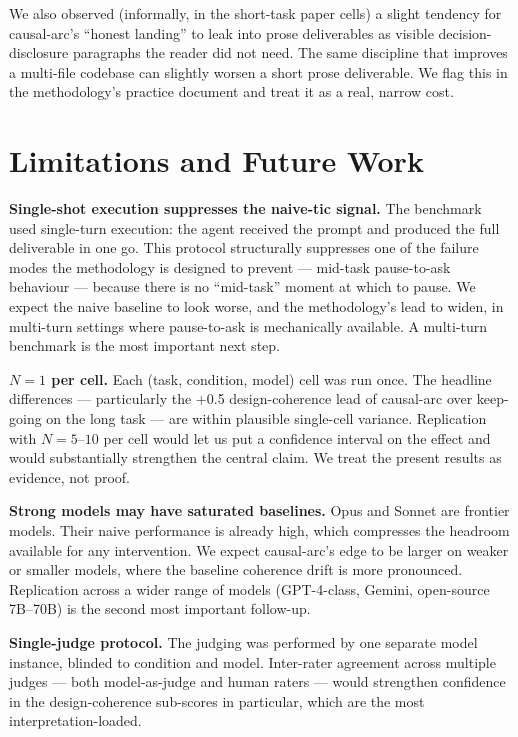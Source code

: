 \documentclass[11pt]{article}
\begin{document}
We also observed (informally, in the short-task paper cells) a slight
tendency for causal-arc's ``honest landing'' to leak into prose
deliverables as visible decision-disclosure paragraphs the reader did not
need. The same discipline that improves a multi-file codebase can
slightly worsen a short prose deliverable. We flag this in the methodology's
practice document and treat it as a real, narrow cost.

\section{Limitations and Future Work}
\label{sec:limits}

\textbf{Single-shot execution suppresses the naive-tic signal.} The
benchmark used single-turn execution: the agent received the prompt and
produced the full deliverable in one go. This protocol structurally
suppresses one of the failure modes the methodology is designed to
prevent --- mid-task pause-to-ask behaviour --- because there is no
``mid-task'' moment at which to pause. We expect the naive baseline to
look worse, and the methodology's lead to widen, in multi-turn settings
where pause-to-ask is mechanically available. A multi-turn benchmark is
the most important next step.

\textbf{$N = 1$ per cell.} Each (task, condition, model) cell was run
once. The headline differences --- particularly the +0.5 design-coherence
lead of causal-arc over keep-going on the long task --- are within
plausible single-cell variance. Replication with $N = 5$--$10$ per cell
would let us put a confidence interval on the effect and would
substantially strengthen the central claim. We treat the present results
as evidence, not proof.

\textbf{Strong models may have saturated baselines.} Opus and Sonnet are
frontier models. Their naive performance is already high, which compresses
the headroom available for any intervention. We expect causal-arc's edge
to be larger on weaker or smaller models, where the baseline coherence
drift is more pronounced. Replication across a wider range of models
(GPT-4-class, Gemini, open-source 7B--70B) is the second most important
follow-up.

\textbf{Single-judge protocol.} The judging was performed by one separate
model instance, blinded to condition and model. Inter-rater agreement
across multiple judges --- both model-as-judge and human raters --- would
strengthen confidence in the design-coherence sub-scores in particular,
which are the most interpretation-loaded.
\end{document}
